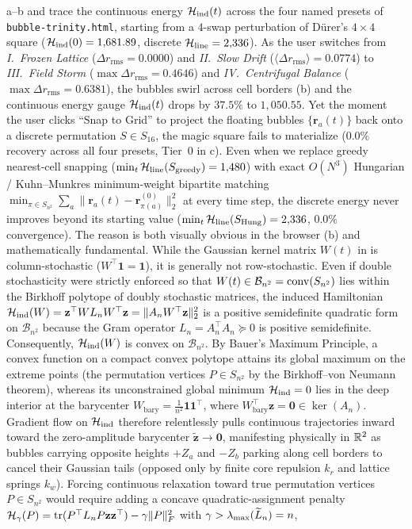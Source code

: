 a--b and  trace the continuous energy $\mathcal{H}_{\mathrm{ind}}(t)$ across the four named presets of \texttt{bubble-trinity.html}, starting from a $4$-swap perturbation of D\"urer's $4\times 4$ square ($\mathcal{H}_{\mathrm{ind}}(0) = 1{,}681.89$, discrete $\mathcal{H}_{\mathrm{line}} = 2{,}336$). As the user switches from \emph{I.~Frozen Lattice} ($\Delta r_{\mathrm{rms}} = 0.0000$) and \emph{II.~Slow Drift} ($\langle\Delta r_{\mathrm{rms}}\rangle = 0.0774$) to \emph{III.~Field Storm} ($\max\Delta r_{\mathrm{rms}} = 0.4646$) and \emph{IV.~Centrifugal Balance} ($\max\Delta r_{\mathrm{rms}} = 0.6381$), the bubbles swirl across cell borders (b) and the continuous energy gauge $\mathcal{H}_{\mathrm{ind}}(t)$ drops by $37.5\%$ to $1{,}050.55$. Yet the moment the user clicks ``Snap to Grid'' to project the floating bubbles $\{\mathbf{r}_a(t)\}$ back onto a discrete permutation $S \in S_{16}$, the magic square fails to materialize ($0.0\%$ recovery across all four presets, Tier~$0$ in c). Even when we replace greedy nearest-cell snapping ($\min_t \mathcal{H}_{\mathrm{line}}(S_{\mathrm{greedy}}) = 1{,}480$) with exact $O(N^3)$ Hungarian / Kuhn--Munkres minimum-weight bipartite matching \cite{kuhn1955hungarian,munkres1957algorithms} $\min_{\pi\in S_{n^2}}\sum_a \|\mathbf{r}_a(t) - \mathbf{r}_{\pi(a)}^{(0)}\|_2^2$ at every time step, the discrete energy never improves beyond its starting value ($\min_t \mathcal{H}_{\mathrm{line}}(S_{\mathrm{Hung}}) = 2{,}336$, $0.0\%$ convergence). The reason is both visually obvious in the browser (b) and mathematically fundamental. While the Gaussian kernel matrix $W(t)$ in  is column-stochastic ($W^\top \mathbf{1} = \mathbf{1}$), it is generally not row-stochastic. Even if double stochasticity were strictly enforced so that $W(t) \in \mathcal{B}_{n^2} = \operatorname{conv}(S_{n^2})$ lies within the Birkhoff polytope of doubly stochastic matrices, the induced Hamiltonian $\mathcal{H}_{\mathrm{ind}}(W) = \mathbf{z}^\top W L_n W^\top \mathbf{z} = \|A_n W^\top \mathbf{z}\|_2^2$ is a positive semidefinite quadratic form on $\mathcal{B}_{n^2}$ because the Gram operator $L_n = A_n^\top A_n \succeq 0$ is positive semidefinite. Consequently, $\mathcal{H}_{\mathrm{ind}}(W)$ is convex on $\mathcal{B}_{n^2}$. By Bauer's Maximum Principle, a convex function on a compact convex polytope attains its global maximum on the extreme points (the permutation vertices $P \in S_{n^2}$ by the Birkhoff--von Neumann theorem), whereas its unconstrained global minimum $\mathcal{H}_{\mathrm{ind}} = 0$ lies in the deep interior at the barycenter $W_{\mathrm{bary}} = \frac{1}{n^2}\mathbf{1}\mathbf{1}^\top$, where $W_{\mathrm{bary}}^\top \mathbf{z} = \mathbf{0} \in \ker(A_n)$. Gradient flow on $\mathcal{H}_{\mathrm{ind}}$ therefore relentlessly pulls continuous trajectories inward toward the zero-amplitude barycenter $\widetilde{\mathbf{z}} \to \mathbf{0}$, manifesting physically in $\mathbb{R}^2$ as bubbles carrying opposite heights $+Z_a$ and $-Z_b$ parking along cell borders to cancel their Gaussian tails (opposed only by finite core repulsion $k_r$ and lattice springs $k_w$). Forcing continuous relaxation toward true permutation vertices $P \in S_{n^2}$ would require adding a concave quadratic-assignment penalty $\mathcal{H}_\gamma(P) = \operatorname{tr}(P^\top L_n P \mathbf{z}\mathbf{z}^\top) - \gamma \|P\|_F^2$ with $\gamma > \lambda_{\max}(\widetilde{L}_n) = n$, 